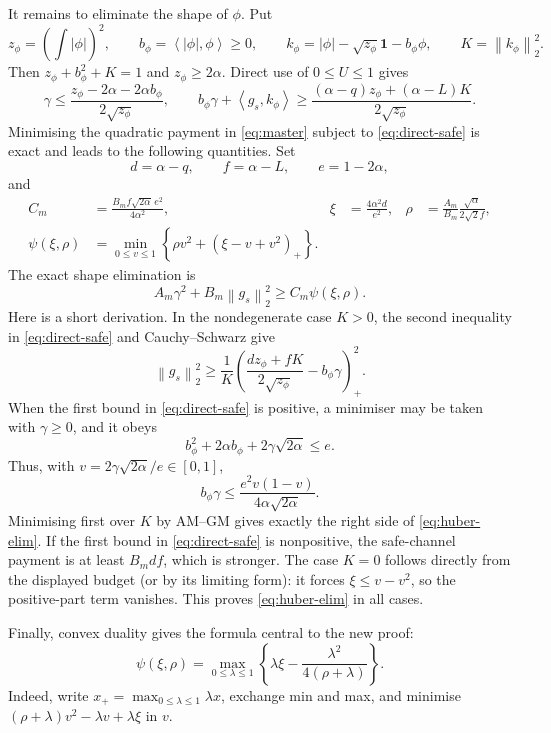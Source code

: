 \documentclass[11pt]{article}
\newcommand{\one}{\mathbf 1}
\newcommand{\ip}[2]{\left\langle #1,#2\right\rangle}
\newcommand{\norm}[1]{\left\lVert #1\right\rVert}
\newcommand{\pos}[1]{\left(#1\right)_+}
\begin{document}
It remains to eliminate the shape of $\phi$.  Put
\[
 z_\phi=\left(\int|\phi|\right)^2,\qquad
 b_\phi=\ip{|\phi|}{\phi}\ge0,\qquad
 k_\phi=|\phi|-\sqrt{z_\phi}\one-b_\phi\phi,\qquad
 K=\norm{k_\phi}_2^2.
\]
Then $z_\phi+b_\phi^2+K=1$ and $z_\phi\ge2\alpha$.  Direct use of
$0\le U\le1$ gives
\begin{equation}\label{eq:direct-safe}
 \gamma\le
 \frac{z_\phi-2\alpha-2\alpha b_\phi}{2\sqrt{z_\phi}},
 \qquad
 b_\phi\gamma+\ip{g_s}{k_\phi}
 \ge
 \frac{(\alpha-q)z_\phi+(\alpha-L)K}{2\sqrt{z_\phi}}.
\end{equation}
Minimising the quadratic payment in \eqref{eq:master} subject to
\eqref{eq:direct-safe} is exact and leads to the following quantities.  Set
\begin{equation}\label{eq:dfedef}
        d=\alpha-q,\qquad f=\alpha-L,\qquad e=1-2\alpha,
\end{equation}
and
\begin{align}
 C_m&=\frac{B_m f\sqrt{2\alpha}\,e^2}{4\alpha^2},
 &
 \xi&=\frac{4\alpha^2d}{e^2},
 &
 \rho&=\frac{A_m}{B_m}\frac{\sqrt\alpha}{2\sqrt2 f},
 \label{eq:Cxirho}\\
 \psi(\xi,\rho)
 &=\min_{0\le v\le1}
   \left\{\rho v^2+\pos{\xi-v+v^2}\right\}.\label{eq:psi}
\end{align}
The exact shape elimination is
\begin{equation}\label{eq:huber-elim}
        A_m\gamma^2+B_m\norm{g_s}_2^2
        \ge C_m\psi(\xi,\rho).
\end{equation}
Here is a short derivation.  In the nondegenerate case $K>0$, the second
inequality in \eqref{eq:direct-safe} and Cauchy--Schwarz give
\[
 \norm{g_s}_2^2\ge
 \frac1K\pos{
 \frac{dz_\phi+fK}{2\sqrt{z_\phi}}-b_\phi\gamma}^2.
\]
When the first bound in \eqref{eq:direct-safe} is positive, a minimiser may be
taken with $\gamma\ge0$, and it obeys
\[
 b_\phi^2+2\alpha b_\phi+2\gamma\sqrt{2\alpha}\le e.
\]
Thus, with $v=2\gamma\sqrt{2\alpha}/e\in[0,1]$,
\[
 b_\phi\gamma\le
 \frac{e^2v(1-v)}{4\alpha\sqrt{2\alpha}}.
\]
Minimising first over $K$ by AM--GM gives exactly the right side of
\eqref{eq:huber-elim}.  If the first bound in \eqref{eq:direct-safe} is
nonpositive, the safe-channel payment is at least $B_mdf$, which is stronger.
The case $K=0$ follows directly from the displayed budget (or by its limiting
form): it forces $\xi\le v-v^2$, so the positive-part term vanishes.  This
proves \eqref{eq:huber-elim} in all cases.

Finally, convex duality gives the formula central to the new proof:
\begin{equation}\label{eq:dual}
 \psi(\xi,\rho)=
 \max_{0\le\lambda\le1}
 \left\{\lambda\xi-
 \frac{\lambda^2}{4(\rho+\lambda)}\right\}.
\end{equation}
Indeed, write $x_+=\max_{0\le\lambda\le1}\lambda x$, exchange min and max,
and minimise $(\rho+\lambda)v^2-\lambda v+\lambda\xi$ in $v$.
\end{document}
